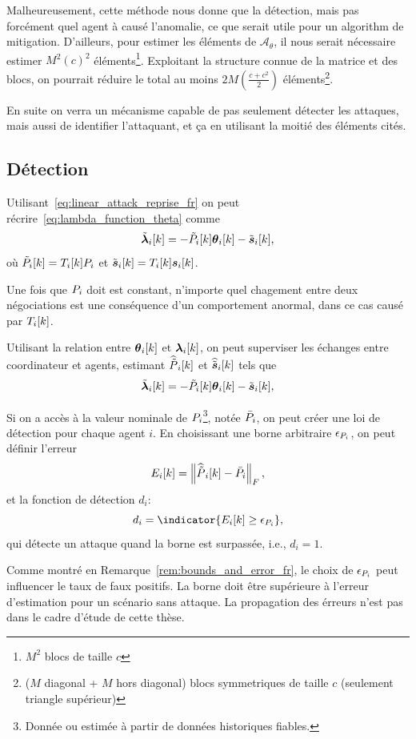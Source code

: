 \documentclass[../main.tex]{subfiles}
\begin{document}
Malheureusement, cette méthode nous donne que la détection, mais pas forcément quel agent à causé l'anomalie, ce que serait utile pour un algorithm de mitigation.
D'ailleurs, pour estimer les éléments de $\mathcal{A}_{\theta}$, il nous serait nécessaire estimer $M^{2}{(c)}^{2}$ éléments\footnote{$M^{2}$ blocs de taille ${c}$}.
Exploitant la structure connue de la matrice et des blocs, on pourrait réduire le total au moins $2M{(\frac{c+{c}^{2}}{2})}$ éléments\footnote{($M$ diagonal + $M$ hors diagonal) blocs symmetriques de taille ${c}$ (seulement triangle supérieur)}.

En suite on verra un mécanisme capable de pas seulement détecter les attaques, mais aussi de identifier l'attaquant, et ça en utilisant la moitié des éléments cités.

\subsection{Détection}\label{sec:detection-mechanism_fr}

Utilisant~\eqref{eq:linear_attack_reprise_fr} on peut récrire~\eqref{eq:lambda_function_theta} comme
\begin{equation}
  \label{eq:lambda_function_theta_tilde}
\lambdaicheat[k]=-\Plintilde\thetaik-\tilde{\vec{s}}_{i}[k],
\end{equation}
où $\tilde{P}_{i}[k]=T_{i}[k]{P}_{i}$ et $\tilde{\boldsymbol{s}}_{i}[k]=T_{i}[k]\boldsymbol{s}_{i}[k]$.

Une fois que ${P}_{i}$ doit est constant, n'importe quel chagement entre deux négociations est une conséquence d'un comportement anormal, dans ce cas causé par $T_{i}[k]$.

Utilisant la relation entre $\thetaik$ et $\lambdaik$, on peut superviser les échanges entre coordinateur et agents, estimant $\widehat{\tilde{P}}_{i}[k]$ et $\widehat{\tilde{\boldsymbol{s}}}_{i}[k]$ tels que
\begin{equation}
  \lambdaicheat[k]=-\Plintilde\thetaik-\tilde{\vec{s}}_{i}[k],
\end{equation}

Si on a accès à la valeur nominale de ${P}_{i}$\footnote{Donnée ou estimée à partir de données historiques fiables.}, notée $\bar{{P}}_{i}$, on peut créer une loi de détection pour chaque agent $i$.
En choisissant une borne arbitraire $\epsilon_{{P}_{i}}$, on peut définir l'erreur
\begin{equation}
  E_{i}[k] =\left\lVert\widehat{\tilde{P}}_{i}[k]-\bar{{P}}_{i}\right\rVert_{F},
\end{equation}
et la fonction de détection $d_{i}$:
\begin{equation}
  d_{i}=\indicator{E_{i}[k]\geq\epsilon_{\Plin}},
\end{equation}
qui détecte un attaque quand la borne est surpassée, i.e., $d_{i}=1$.
\begin{remark}
  Comme montré en Remarque~\ref{rem:bounds_and_error_fr}, le choix de $\epsilon_{{P}_{i}}$ peut influencer le taux de faux positifs.
  La borne doit être supérieure à l'erreur d'estimation pour un scénario sans attaque.
  La propagation des érreurs n'est pas dans le cadre d'étude de cette thèse.
\end{remark}
\end{document}
